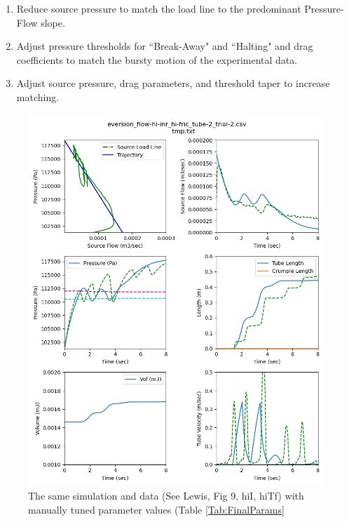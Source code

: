 \documentclass[letterpaper]{article}
\begin{document}
\begin{enumerate}
    \item Reduce source pressure to match the load line to the predominant Pressure-Flow slope.
    \item  Adjust pressure thresholds for ``Break-Away" and ``Halting" and
    drag coefficients to match the
    bursty motion of the experimental data.
    \item  Adjust source pressure, drag parameters, and threshold taper to
    increase matching.
\end{enumerate}


\begin{figure}\centering
\includegraphics[width=.75\textwidth]{Set6wFinalParms.png}
\caption{The same simulation and data (See Lewis, Fig 9, hiI, hiTf) with manually tuned parameter values (Table \ref{Tab:FinalParams}}
\label{Fig:FinalSimCompare}
\end{figure}
\end{document}
